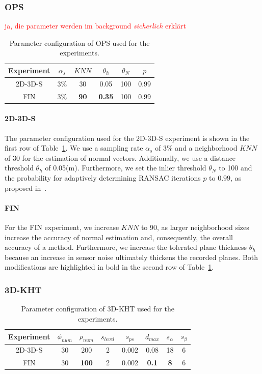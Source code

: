 \documentclass[main.tex]{subfiles}
\begin{document}
\subsubsection{OPS}

\textcolor{red}{ja, die parameter werden im background \textit{sicherlich} erklärt}
\begin{table}[H]
    \centering
    \begin{tabular}{c|ccccc}
        Experiment & $\alpha_s$ & $KNN$       & $\theta_{h}$  & $\theta_{N}$ & $p$  \\ \hline
        2D-3D-S    & 3\%        & 30          & 0.05          & 100          & 0.99 \\
        FIN        & 3\%        & \textbf{90} & \textbf{0.35} & 100          & 0.99
    \end{tabular}%
    \caption{Parameter configuration of OPS used for the experiments.}
    \label{tab:ops-param}
\end{table}

\paragraph{2D-3D-S}
The parameter configuration used for the 2D-3D-S experiment is shown in the first row of Table~\ref{tab:ops-param}.
We use a sampling rate $\alpha_s$ of 3\% and a neighborhood $KNN$ of 30 for the estimation of normal vectors.
Additionally, we use a distance threshold $\theta_h$ of 0.05(m).
Furthermore, we set the inlier threshold $\theta_N$ to 100 and the probability for adaptively determining RANSAC iterations
$p$ to $0.99$, as proposed in~\cite[Section~4A]{Sun_Mordohai_2019}.

\paragraph{FIN}
For the FIN experiment, we increase $KNN$ to 90, as larger neighborhood sizes increase the accuracy of normal estimation and,
consequently, the overall accuracy of a method.
Furthermore, we increase the tolerated plane thickness $\theta_h$ because an increase in sensor noise ultimately thickens the recorded planes.
Both modifications are highlighted in bold in the second row of Table~\ref{tab:ops-param}.

\subsubsection{3D-KHT}
\begin{table}[H]
    \centering
    \begin{tabular}{c|ccccccc}
        Experiment & $\phi_{num}$ & $\rho_{num}$ & $s_{level}$ & $s_{ps}$ & $d_{max}$    & $s_\alpha$ & $s_\beta$ \\ \hline
        2D-3D-S    & 30           & 200          & 2           & 0.002    & 0.08         & 18         & 6         \\
        FIN        & 30           & \textbf{100} & 2           & 0.002    & \textbf{0.1} & \textbf{8} & 6
    \end{tabular}%
    \caption{Parameter configuration of 3D-KHT used for the experiments.}
    \label{tab:3dkht-param}
\end{table}
\end{document}
